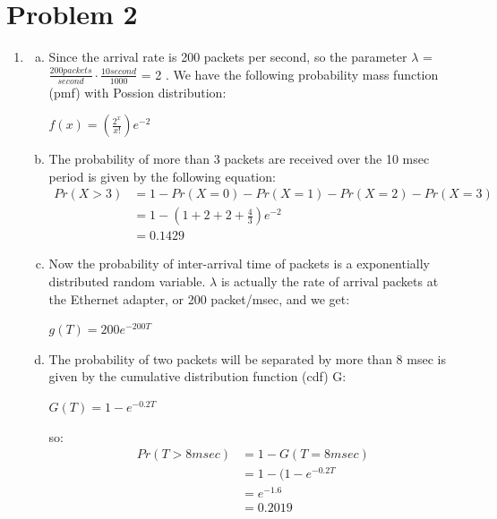 \documentclass{article}   	                         %
\begin{document}
\begin{enumerate}[(a)]
\end{enumerate}
\section*{Problem 2}
\begin{enumerate}[I]
\item
\begin{enumerate}[(a)]
\item
Since the arrival rate is 200 packets per second, so the parameter $\lambda$ = $\frac{200 packets}{second}\cdot \frac{10 second}{1000} $ = 2 . We have the following probability mass function (pmf) with Possion distribution:\\
\begin{center}
$f (x) = \left(\frac{2^x}{x!}\right)e^{-2}$\\
\end{center}
\item
The probability of more than 3 packets are received over the 10 msec period is given by the following equation:\\
\begin{align*}
 Pr (X > 3)
   & = 1 - Pr(X = 0) - Pr(X = 1) - Pr(X = 2) - Pr(X = 3)
 \\& = 1 - (1 + 2 + 2 + \frac{4}{3})e^{-2}
 \\& = 0.1429
\end{align*}
\item
Now the probability of inter-arrival time of packets is a exponentially distributed random variable. $\lambda$ is actually the rate of arrival packets at the Ethernet adapter, or 200 packet/msec, and we get:\\ 
\begin{center}
$g (T) = 200e^{-200T}$\\
\end{center}
\item
The probability of two packets will be separated by more than 8 msec is given by the cumulative distribution function (cdf) G:\\
\begin{center}
$G (T) = 1- e^{-0.2T}$\\
\end{center}
so:\\
\begin{align*}
 Pr (T > 8 msec)
   & = 1 - G(T = 8 msec)
 \\& = 1 - (1 - e^{-0.2T}
 \\& = e^{-1.6}
 \\& = 0.2019

\end{align*}
\end{enumerate}
\end{enumerate}
\end{document}
